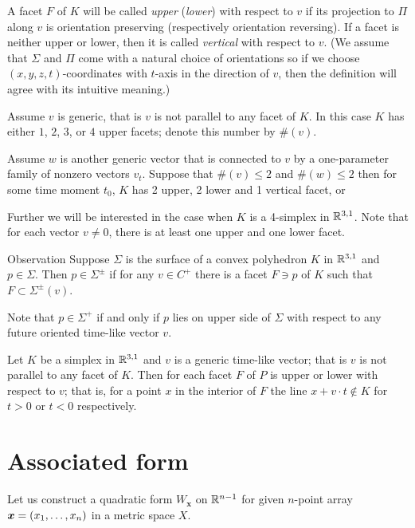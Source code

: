 \documentclass{article}
\begin{document}
A facet $F$ of $K$ will be called \emph{upper} (\emph{lower}) with respect to $v$ if its projection to $\Pi$ along $v$ is orientation preserving (respectively orientation reversing).
If a facet is neither upper or lower, then it is called \emph{vertical} with respect to $v$.
(We assume that $\Sigma$ and $\Pi$ come with a natural choice of orientations so if we choose $(x,y,z,t)$-coordinates with $t$-axis in the direction of $v$, then the definition will agree with its intuitive meaning.)


Assume $v$ is generic, that is $v$ is not parallel to any facet of $K$.
In this case $K$ has either $1$, $2$, $3$, or $4$ upper facets; denote this number by $\#(v)$.

Assume $w$ is another generic vector that is connected to $v$ by a one-parameter family of nonzero vectors $v_t$.
Suppose that $\#(v)\le 2$ and $\#(w)\le 2$ then for some time moment $t_0$,
$K$ has 2 upper, 2 lower and 1 vertical facet, or 

Further we will be interested in the case when $K$ is a 4-simplex in $\mathbb{R}^{3,1}$.
Note that for each vector $v\ne 0$, there is at least one upper and one lower facet. 




\begin{thm}{Observation}
Suppose $\Sigma$ is the surface of a convex polyhedron $K$ in $\mathbb{R}^{3,1}$ and $p\in\Sigma$.
Then $p\in\Sigma^\pm$ if for any $v\in C^+$ there is a facet $F\ni p$ of $K$ such that $F\subset \Sigma^\pm(v)$.
\end{thm}



Note that $p\in\Sigma^+$ if and only if $p$ lies on upper side of $\Sigma$ with respect to any future oriented time-like vector $v$.

Let $K$ be a simplex in $\mathbb{R}^{3,1}$
and $v$ is a generic time-like vector;
that is $v$ is not parallel to any facet of $K$.
Then for each facet $F$ of $P$ is upper or lower with respect to $v$;
that is, for a point $x$ in the interior of $F$ the line $x+v\cdot t\notin K$ for $t>0$ or $t<0$ respectively.




\section{Associated form}

Let us construct a quadratic form $W_{\bm{x}}$ on $\mathbb{R}^{n-1}$ 
for given $n$-point array $\bm{x}\z=(x_1,\dots,x_n)$ in a metric space $X$.
\end{document}
